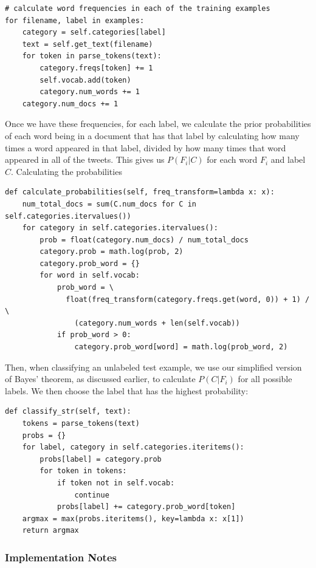 \documentclass[12pt,a4paper]{article}
\begin{document}
\begin{verbatim}
# calculate word frequencies in each of the training examples
for filename, label in examples:
    category = self.categories[label]
    text = self.get_text(filename)
    for token in parse_tokens(text):
        category.freqs[token] += 1
        self.vocab.add(token)
        category.num_words += 1
    category.num_docs += 1
\end{verbatim}

Once we have these frequencies, for each label, we calculate the prior probabilities of each word being in a document that has that label by calculating how many times a word appeared in that label, divided by how many times that word appeared in all of the tweets. This gives us $P(F_i | C)$ for each word $F_i$ and label $C$. Calculating the probabilities 

\begin{verbatim}
def calculate_probabilities(self, freq_transform=lambda x: x):
    num_total_docs = sum(C.num_docs for C in self.categories.itervalues())
    for category in self.categories.itervalues():
        prob = float(category.num_docs) / num_total_docs
        category.prob = math.log(prob, 2)
        category.prob_word = {}
        for word in self.vocab:
            prob_word = \
              float(freq_transform(category.freqs.get(word, 0)) + 1) / \
                (category.num_words + len(self.vocab))
            if prob_word > 0:
                category.prob_word[word] = math.log(prob_word, 2)
\end{verbatim}

Then, when classifying an unlabeled test example, we use our simplified version of Bayes' theorem, as discussed earlier, to calculate $P(C | F_i)$ for all possible labels. We then choose the label that has the highest probability:

\begin{verbatim}
def classify_str(self, text):
    tokens = parse_tokens(text)
    probs = {}
    for label, category in self.categories.iteritems():
        probs[label] = category.prob
        for token in tokens:
            if token not in self.vocab:
                continue
            probs[label] += category.prob_word[token]
    argmax = max(probs.iteritems(), key=lambda x: x[1])
    return argmax
\end{verbatim}

\subsubsection { Implementation Notes }
\end{document}
